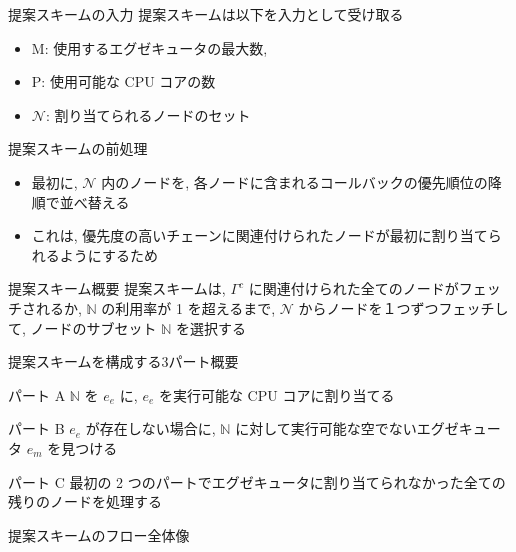 \begin{frame}{提案スキームの入力}
    提案スキームは以下を入力として受け取る
    \begin{itemize}
        \item $\mathrm{M}$: 使用するエグゼキュータの最大数,
        \item $\mathrm{P}$: 使用可能な CPU コアの数
        \item $\mathcal{N}$: 割り当てられるノードのセット
    \end{itemize}
\end{frame}

\begin{frame}{提案スキームの前処理}
    \begin{itemize}
        \item 最初に, $\mathcal{N}$ 内のノードを, 各ノードに含まれるコールバックの優先順位の降順で並べ替える
        \item これは, 優先度の高いチェーンに関連付けられたノードが最初に割り当てられるようにするため
    \end{itemize}
\end{frame}

\begin{frame}{提案スキーム概要}
    提案スキームは, $\Gamma^{c}$ に関連付けられた全てのノードがフェッチされるか, $\mathbb{N}$ の利用率が 1 を超えるまで, $\mathcal{N}$ からノードを１つずつフェッチして, ノードのサブセット $\mathbb{N}$ を選択する
\end{frame}

\begin{frame}{提案スキームを構成する3パート概要}
    \begin{block}{パート A}
        $\mathbb{N}$ を $e_{e}$ に, $e_{e}$ を実行可能な CPU コアに割り当てる
    \end{block}
    \begin{block}{パート B}
        $e_{e}$ が存在しない場合に, $\mathbb{N}$ に対して実行可能な空でないエグゼキュータ $e_{m}$ を見つける
    \end{block}
    \begin{block}{パート C}
        最初の 2 つのパートでエグゼキュータに割り当てられなかった全ての残りのノードを処理する
    \end{block}
\end{frame}

\begin{frame}{提案スキームのフロー全体像}
\end{frame}

